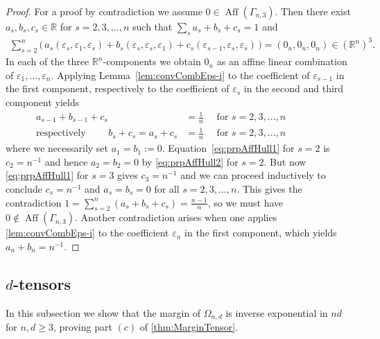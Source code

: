\documentclass[10pt,a4paper]{article}
\numberwithin{equation}{section}
\DeclareMathOperator{\aff}{Aff}
\newcommand{\RR}{\mathbb R}
\newcommand{\eps}{\varepsilon}
\begin{document}
\begin{proof}
For a proof by contradiction we assume $0 \in \aff(\Gamma_{n,3})$.  Then there exist $a_s, b_s, c_s \in \RR$ for $s=2,3,\ldots,n$ such that $\sum_s a_s + b_s + c_s = 1$ and
	\begin{align*}
	\sum_{s=2}^n \big( \, a_s (\eps_s, \eps_1, \eps_s) + b_s (\eps_s, \eps_s, \eps_1) + c_s (\eps_{s-1}, \eps_s, \eps_s) \, \big) = (0_n, 0_n, 0_n) \in (\RR^n)^3.
	\end{align*}
In each of the three $\RR^n$-components we obtain $0_n$ as an affine linear combination of $\eps_1, \ldots,\eps_n$.
Applying Lemma~\ref{lem:convCombEps-i} to the coefficient of $\eps_{s-1}$ in the first component,  respectively to the coefficient of $\eps_s$ in the second and third component yields
	\begin{align}
	a_{s-1} + b_{s-1} + c_{s} &= \frac{1}{n} \quad \text{ for } s=2,3,\ldots,n \label{eq:prpAffHull1} \\
	\text{respectively } \qquad
	b_s+ c_s = a_s + c_s &= \frac{1}{n} \quad \text{ for } s=2,3,\ldots,n  \qquad\qquad \label{eq:prpAffHull2}
 	\end{align}
where we necessarily set $a_1 = b_1 := 0$. Equation~\eqref{eq:prpAffHull1} for $s=2$ is $c_2 = n^{-1}$ and hence $a_2=b_2=0$ by \eqref{eq:prpAffHull2} for $s=2$. But now \eqref{eq:prpAffHull1} for $s=3$ gives $c_3 = n^{-1}$ and we can proceed inductively to conclude $c_s = n^{-1}$ and $a_s = b_s = 0$ for all $s=2,3,\ldots,n$.  This gives the contradiction $1 = \sum_{s=2}^n (a_s + b_s + c_s) = \frac{n-1}{n}$, so we must have $0 \notin \aff(\Gamma_{n,3})$. Another contradiction arises when one applies \cref{lem:convCombEps-i} to the coefficient $\eps_n$ in the first component, which yields $a_n + b_n = n^{-1}$.
\end{proof}



\subsection{$d$-tensors}\label{subsec:dTensors}
In this subsection we show that the margin of $\Omega_{n,d}$ is inverse exponential in $nd$ for $n, d \geq 3$, proving part $(c)$ of \cref{thm:MarginTensor}.
\end{document}
